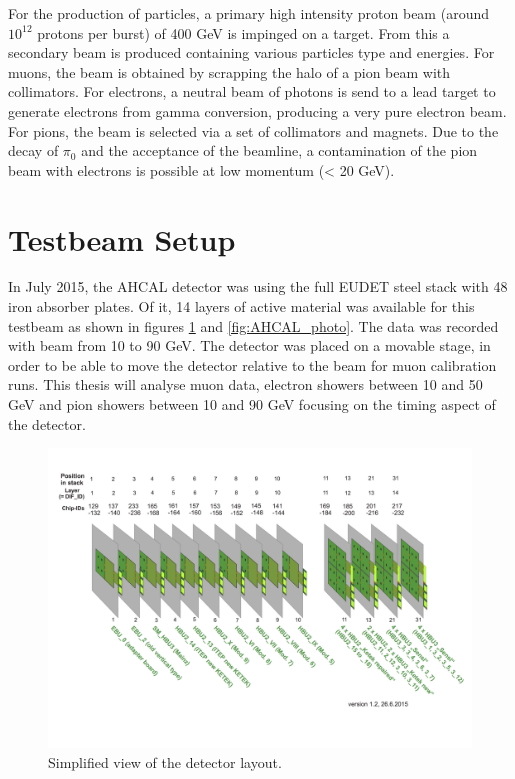 For the production of particles, a primary high intensity proton beam (around $10^{12}$ protons per burst) of 400 GeV is impinged on a target. From this a secondary beam is produced containing various particles type and energies. For muons, the beam is obtained by scrapping the halo of a pion beam with collimators. For electrons, a neutral beam of photons is send to a lead target to generate electrons from gamma conversion, producing a very pure electron beam. For pions, the beam is selected via a set of collimators and magnets. Due to the decay of $\pi_0$ and the acceptance of the beamline, a contamination of the pion beam with electrons is possible at low momentum (< 20 GeV).

\section{Testbeam Setup}
\label{sec:TBsetup}

In July 2015, the AHCAL detector was using the full EUDET steel stack \cite{EUDET-Report-2010-02} with 48 iron absorber plates. Of it, 14 layers of active material was available for this testbeam as shown in figures \ref{fig:Det_layout} and \ref{fig:AHCAL_photo}. The data was recorded with beam from 10 to 90 GeV. The detector was placed on a movable stage, in order to be able to move the detector relative to the beam for muon calibration runs. This thesis will analyse muon data, electron showers between 10 and 50 GeV and pion showers between 10 and 90 GeV focusing on the timing aspect of the detector.

\begin{figure}[htbp!]
	\centering
	\includegraphics[width=1\linewidth]{chap5/fig_EnergyCalib/Detector_layout.png}
	\caption{Simplified view of the detector layout.} \label{fig:Det_layout}
\end{figure}

